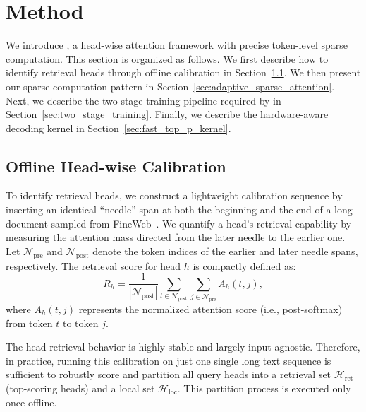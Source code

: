 \section{Method}

We introduce \name, a head-wise attention framework with precise token-level sparse computation. This section is organized as follows. We first describe how to identify retrieval heads through offline calibration in Section~\ref{sec:offline_calibration}. We then present our sparse computation pattern in Section~\ref{sec:adaptive_sparse_attention}. Next, we describe the two-stage training pipeline required by \name in Section~\ref{sec:two_stage_training}. Finally, we describe the hardware-aware decoding kernel in Section~\ref{sec:fast_top_p_kernel}.

\subsection{Offline Head-wise Calibration}
\label{sec:offline_calibration}
To identify retrieval heads, we construct a lightweight calibration sequence by inserting an identical ``needle'' span at both the beginning and the end of a long document sampled from FineWeb~\citep{fineweb}. We quantify a head's retrieval capability by measuring the attention mass directed from the later needle to the earlier one. Let $\mathcal{N}_{\mathrm{pre}}$ and $\mathcal{N}_{\mathrm{post}}$ denote the token indices of the earlier and later needle spans, respectively. The retrieval score for head $h$ is compactly defined as:
\begin{equation}
\label{eq:head_retrieval_score}
R_h = \frac{1}{|\mathcal{N}_{\mathrm{post}}|}\sum_{t\in\mathcal{N}_{\mathrm{post}}} \sum_{j\in\mathcal{N}_{\mathrm{pre}}} A_h(t,j),
\end{equation}
where $A_h(t,j)$ represents the normalized attention score (i.e., post-softmax) from token $t$ to token $j$. 

The head retrieval behavior is highly stable and largely input-agnostic. 
Therefore, in practice, running this calibration on just one single long text sequence is sufficient to robustly score and partition all query heads into a retrieval set $\mathcal{H}_{\mathrm{ret}}$ (top-scoring heads) and a local set $\mathcal{H}_{\mathrm{loc}}$. This partition process is executed only once offline.

